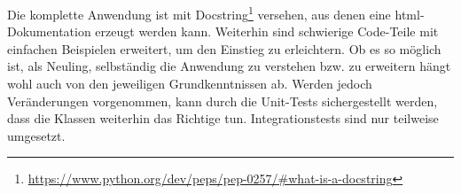 Die komplette Anwendung ist mit Docstring\footnote{\url{https://www.python.org/dev/peps/pep-0257/\#what-is-a-docstring}} versehen, aus denen eine html-Dokumentation erzeugt werden kann. Weiterhin sind schwierige Code-Teile mit einfachen Beispielen erweitert, um den Einstieg zu erleichtern. Ob es so möglich ist, als Neuling, selbständig die Anwendung zu verstehen bzw. zu erweitern hängt wohl auch von den jeweiligen Grundkenntnissen ab. Werden jedoch Veränderungen vorgenommen, kann durch die Unit-Tests sichergestellt werden, dass die Klassen weiterhin das Richtige tun. Integrationstests sind nur teilweise umgesetzt.